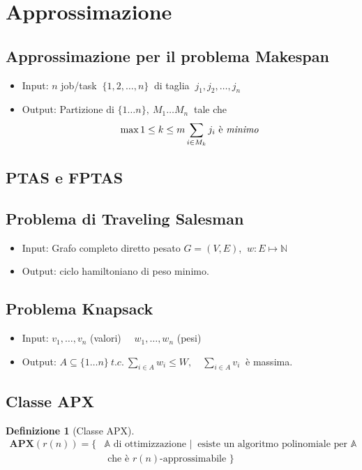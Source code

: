 \documentclass[a4paper]{article}
\theoremstyle{definition}
\newtheorem{definit}{Definizione}[subsection]
\newcommand{\N}{\mathbb{N}}
\newcommand{\apx}{\mathbf{APX}}
\newcommand{\prob}[1]{\mathbb{#1}}
\begin{document}
		
	\section{Approssimazione}
		
		\subsection{Approssimazione per il problema Makespan}
			\begin{itemize}
				\item Input: $ n $ job/task $ \ \{1, 2,\dots, n \} \ $ di taglia $ \ j_1, j_2,\dots, j_n $
				\item Output: Partizione di $ \{1 \dots n \},\ M_1 \dots M_n \ $ tale che
				\[
					\max\limits{1\leq k\leq m} \sum\limits_{i\in M_k} j_i \text{ è \textit{minimo}}
				\]
			\end{itemize}
			
		\subsection{PTAS e FPTAS}
		
		
		\subsection{Problema di Traveling Salesman}
			\begin{itemize}
				\item Input: Grafo completo diretto pesato $ G = (V, E) $, $ \ w : E \mapsto \N $
				\item Output: ciclo hamiltoniano di peso minimo.
			\end{itemize}
		
		\subsection{Problema Knapsack}
			\begin{itemize}
				\item Input: $ v_1, \dots, v_n $ (valori) $ \quad w_1, \dots, w_n $ (pesi)
				\item Output: $ A \subseteq \{1\dots n \} \ t.c.\ \sum\limits_{i \in A} w_i \leq W,\quad \sum\limits_{i \in A} v_i \ $ è massima.
			\end{itemize}
		
		\subsection{Classe APX}
			\begin{definit}[Classe APX]
				\begin{align*}
					\apx(r(n)) = \big\lbrace & \prob{A} \text{ di ottimizzazione } \Big| \ \text{ esiste un algoritmo polinomiale per } \prob{A} \\
					& \text{ che è } r(n)\text{-approssimabile } \big\rbrace
				\end{align*}
			\end{definit}
		
\end{document}
